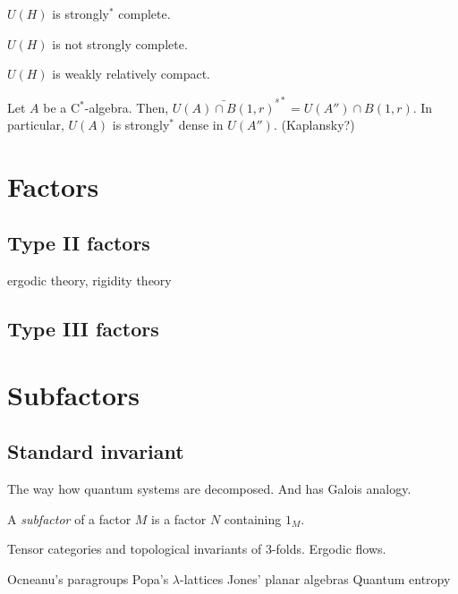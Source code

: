 \documentclass{../../large}
\begin{document}
\begin{prb}
\begin{parts}
\item $U(H)$ is strongly$^*$ complete.
\item $U(H)$ is not strongly complete.
\item $U(H)$ is weakly relatively compact.
\end{parts}
\end{prb}


Let $A$ be a C$^*$-algebra.
Then, $\bar{U(A)\cap B(1,r)}^{s*}=U(A'')\cap B(1,r)$.
In particular, $U(A)$ is strongly$^*$ dense in $U(A'')$.
(Kaplansky?)


\part{Factors}
\chapter{Type II factors}
ergodic theory, rigidity theory

\chapter{Type III factors}



\part{Subfactors}


\chapter{Standard invariant}

The way how quantum systems are decomposed.
And has Galois analogy.

\begin{prb}
A \emph{subfactor} of a factor $M$ is a factor $N$ containing $1_M$.
\end{prb}

Tensor categories and topological invariants of 3-folds.
Ergodic flows.


Ocneanu's paragroups
Popa's $\lambda$-lattices
Jones' planar algebras
Quantum entropy
\end{document}

